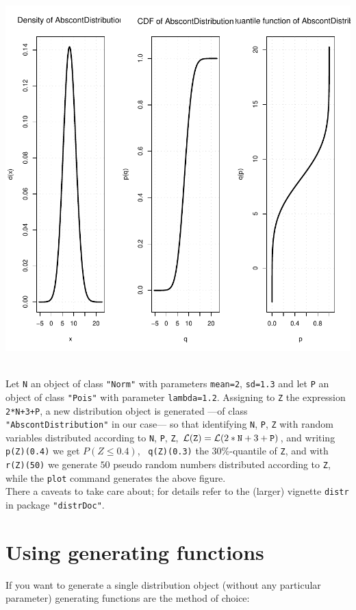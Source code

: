 \documentclass[10pt]{article}
\let\code\lstinline
\def\pkg#1{{\tt "#1"}}
\begin{document}
\includegraphics{newDistributions-exam1}
\par
{}\\
Let \code{N} an object of class \code{"Norm"} with parameters  \code{mean=2},
\code{sd=1.3} and let \code{P}  an object of class \code{"Pois"} with parameter 
\code{lambda=1.2}. Assigning to \code{Z} the expression \code{2*N+3+P}, a 
new distribution object is generated ---of class \code{"AbscontDistribution"} in 
our case--- so that identifying \code{N}, \code{P}, \code{Z} with random 
variables distributed according to {\tt N}, {\tt P}, {\tt Z}, 
${\cal L}({\tt Z})={\cal L}(2*{\tt N}+3+{\tt P})$,  and writing \code{p(Z)(0.4)}  
we get $P(Z\leq 0.4)$, \code{ q(Z)(0.3)}  the $30\%$-quantile of {\tt Z},
and with \code{r(Z)(50)} we generate $50$ pseudo random numbers distributed 
according to {\tt Z}, while the \code{plot} command generates the above figure.\\

There a caveats to take care about; for details refer to the (larger) vignette
{\tt distr} in package \pkg{distrDoc}.
\section{Using generating functions}
If you want to generate a single distribution object (without any particular parameter)
generating functions are the method of choice:\\
\end{document}
